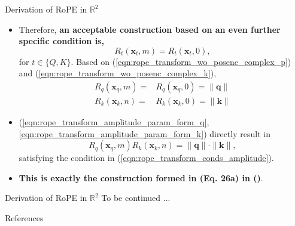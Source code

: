\documentclass{beamer}
\begin{document}
	
	\begin{frame}{Derivation of RoPE in $\mathbb{R}^2$}		
			\begin{itemize}
				\item Therefore, \textbf{an acceptable construction based on an even further specific condition is,}
				\begin{equation}
					R_t(\mathbf{x}_t, m) = R_t(\mathbf{x}_t, 0),
				\end{equation}
				for $t\in\{Q,K\}$. Based on (\ref{eqn:rope_transform_wo_posenc_complex_p}) and (\ref{eqn:rope_transform_wo_posenc_complex_k}),
				\begin{align}
					R_q(\mathbf{x}_q, m) = & R_q(\mathbf{x}_q, 0) = \|\mathbf{q}\| \label{eqn:rope_transform_amplitude_param_form_q}\\
					R_k(\mathbf{x}_k, n) = & R_k(\mathbf{x}_k, 0) = \|\mathbf{k}\| \label{eqn:rope_transform_amplitude_param_form_k}
				\end{align}
				\item (\ref{eqn:rope_transform_amplitude_param_form_q}, \ref{eqn:rope_transform_amplitude_param_form_k}) directly result in 
				\begin{equation}
					R_q(\mathbf{x}_q, m)R_k(\mathbf{x}_k, n) = \|\mathbf{q}\|\cdot\|\mathbf{k}\|,
				\end{equation}
				satisfying the condition in (\ref{eqn:rope_transform_conds_amplitude}).
				\item \textbf{This is exactly the construction formed in (Eq. 26a) in (\cite{su2023roformerenhancedtransformerrotary})}. 
			\end{itemize}  		
		\end{frame}	
		
		\begin{frame}{Derivation of RoPE in $\mathbb{R}^2$}		
			To be continued ...
		\end{frame}
		
		\begin{frame}[allowframebreaks]{References}
			\printbibliography
		\end{frame}
	
\end{document}

